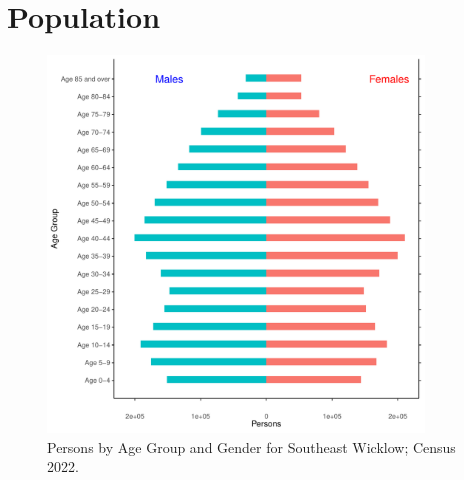 \documentclass{article}
\begin{document}
\pagebreak

\section{Population} 
\label{sect:Pop}

\begin{figure}[h]
	\centering
	\includegraphics[width = 100mm]{../figures/PyramidPlot.pdf}
	\caption{Persons by Age Group and Gender for Southeast Wicklow; Census 2022.}
	\label{fig:2ae19629-1a6a-13a3-e055-000000000001}
	\end{figure}
\end{document}
